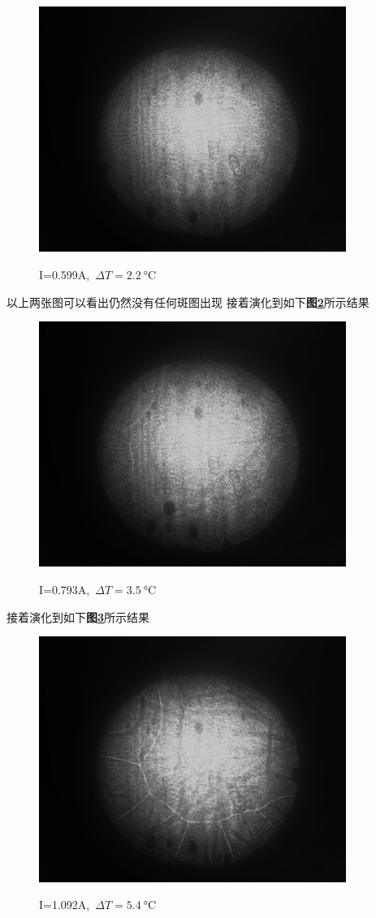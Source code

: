 \documentclass[a4paper]{article}
\begin{document}
\begin{figure}[H]
 \centering
 \caption{I=0.599A,\ $\Delta T=\SI{2.2}{\celsius}$}
 \includegraphics[height=8cm, width=10cm]{images/32.0_34.2_0.599_6.07.bmp}
 \label{result:fig12}
\end{figure}
以上两张图可以看出仍然没有任何斑图出现
\newpage
接着演化到如下\textbf{图\ref{result:fig13}}所示结果
\begin{figure}[H]
 \centering
 \caption{I=0.793A,\ $\Delta T=\SI{3.5}{\celsius}$}
 \includegraphics[height=8cm, width=10cm]{images/33.7_37.2_0.793_6.18.bmp}
 \label{result:fig13}
\end{figure}
接着演化到如下\textbf{图\ref{result:fig14}}所示结果
\begin{figure}[H]
 \centering
 \caption{I=1.092A,\ $\Delta T=\SI{5.4}{\celsius}$}
 \includegraphics[height=8cm, width=10cm]{images/36.9_42.3_1.092_6.27.bmp}
 \label{result:fig14}
\end{figure}
\end{document}
